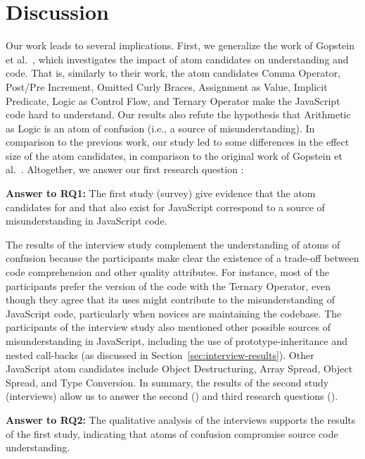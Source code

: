 \section{Discussion}
\label{sec:discussion}

Our work leads to several implications.
First, we generalize the
work of Gopstein et al.~\cite{DBLP:conf/sigsoft/GopsteinIYDZYC17},
which investigates
the impact of atom candidates on
understanding \clang and \cpplang code. That is,
similarly to their work, the atom candidates
Comma Operator, Post/Pre Increment, Omitted Curly Braces,
Assignment as Value, Implicit Predicate, Logic as
Control Flow, and Ternary Operator make the 
JavaScript code hard to understand. Our results also 
refute the hypothesis that Arithmetic as Logic is an atom of
confusion (i.e., a source of misunderstanding).
In comparison to the previous work, our study
led to some differences in the effect size
of the atom candidates, in comparison to the original
work of Gopstein et al.~\cite{DBLP:conf/sigsoft/GopsteinIYDZYC17}.
Altogether, we answer our first research question
\emph{\rqa}:

\begin{mh}
  {\bf Answer to RQ1:} The first study (survey) give evidence that
  the atom candidates for \clang and \cpplang
  that also exist for JavaScript correspond to
  a source of misunderstanding in
  JavaScript code. 
\end{mh}

The results of the interview study complement the understanding
of atoms of confusion because the participants make
clear the existence of a trade-off between code comprehension
and other quality attributes. For instance, most of the participants
prefer the version of the code with the Ternary Operator,
even though they agree that its uses might contribute to the
misunderstanding of JavaScript code, particularly when novices are maintaining
the codebase. The participants of the interview study also
mentioned other possible sources of misunderstanding in JavaScript,
including the use of prototype-inheritance and nested call-backs (as discussed in Section~\ref{sec:interview-results}). Other JavaScript atom candidates include
Object Destructuring, Array Spread, Object Spread, and Type Conversion.
In summary, the results of the second study (interviews) allow
us to answer the second (\rqb) and third research questions
(\emph{\rqc}).

\begin{mh}
  {\bf Answer to RQ2:} The qualitative analysis of the
  interviews supports the results of the first study,
  indicating that atoms of confusion compromise
  source code understanding. 
\end{mh}

